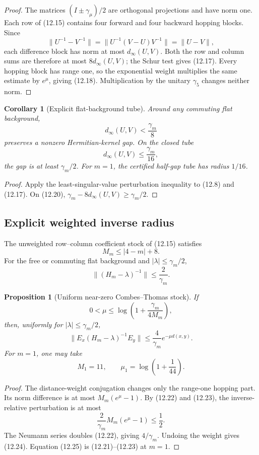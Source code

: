\documentclass[11pt]{article}
\newtheorem{proposition}[theorem]{Proposition}
\newtheorem{corollary}[theorem]{Corollary}
\begin{document}
\begin{proof}
The matrices
\((I\pm\gamma_\mu)/2\) are orthogonal projections and have norm one.
Each row of (12.15) contains four forward and four backward hopping
blocks.  Since
\[
 \|U^{-1}-V^{-1}\|
 =
 \|U^{-1}(V-U)V^{-1}\|
 =
 \|U-V\|,
\]
each difference block has norm at most \(d_\infty(U,V)\).  Both the row
and column sums are therefore at most \(8d_\infty(U,V)\); the Schur test
gives (12.17).  Every hopping block has range one, so the exponential
weight multiplies the same estimate by \(e^\mu\), giving (12.18).
Multiplication by the unitary \(\gamma_5\) changes neither norm.
\end{proof}

\begin{corollary}[Explicit flat-background tube]
\label{cor:v11v12-tube}
Around any commuting flat background,
\[
 d_\infty(U,V)<\frac{\gamma_m}{8}
 \tag{12.19}
\]
preserves a nonzero Hermitian-kernel gap.  On the closed tube
\[
 d_\infty(U,V)\leq\frac{\gamma_m}{16},
 \tag{12.20}
\]
the gap is at least \(\gamma_m/2\).  For \(m=1\), the certified half-gap
tube has radius \(1/16\).
\end{corollary}

\begin{proof}
Apply the least-singular-value perturbation inequality to (12.8) and
(12.17).  On (12.20),
\(\gamma_m-8d_\infty(U,V)\geq\gamma_m/2\).
\end{proof}

\subsection{Explicit weighted inverse radius}

The unweighted row--column coefficient stock of (12.15) satisfies
\[
 M_m\leq |4-m|+8.
 \tag{12.21}
\]
For the free or commuting flat background and
\(|\lambda|\leq\gamma_m/2\),
\[
 \|(H_m-\lambda)^{-1}\|\leq\frac2{\gamma_m}.
 \tag{12.22}
\]

\begin{proposition}[Uniform near-zero Combes--Thomas stock]
\label{prop:v11v12-weighted}
If
\[
 0<\mu\leq
 \log\left(1+\frac{\gamma_m}{4M_m}\right),
 \tag{12.23}
\]
then, uniformly for \(|\lambda|\leq\gamma_m/2\),
\[
 \|E_x(H_m-\lambda)^{-1}E_y\|
 \leq
 \frac4{\gamma_m}e^{-\mu d(x,y)}.
 \tag{12.24}
\]
For \(m=1\), one may take
\[
 M_1=11,\qquad
 \mu_1=\log\left(1+\frac1{44}\right).
 \tag{12.25}
\]
\end{proposition}

\begin{proof}
The distance-weight conjugation changes only the range-one hopping part.
Its norm difference is at most
\(M_m(e^\mu-1)\).  By (12.22) and (12.23), the inverse-relative
perturbation is at most
\[
 \frac2{\gamma_m}M_m(e^\mu-1)\leq\frac12.
\]
The Neumann series doubles (12.22), giving \(4/\gamma_m\).
Undoing the weight gives (12.24).  Equation (12.25) is (12.21)--(12.23)
at \(m=1\).
\end{proof}
\end{document}
